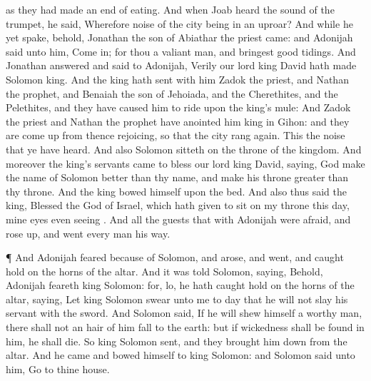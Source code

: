 {{} as they had made an
end of
eating. And when
Joab
heard the
sound of the
trumpet, he
said, Wherefore
{}
noise of the
city being in an
uproar?
And while he yet
spake, behold,
Jonathan the
son of
Abiathar the
priest
came: and
Adonijah
said unto him, Come
in; for thou
{} a
valiant
man, and
bringest
good
tidings.
And
Jonathan
answered and
said to
Adonijah,
Verily our
lord
king
David hath made
Solomon
king.
And the
king hath
sent with him
Zadok the
priest, and
Nathan the
prophet, and
Benaiah the
son of
Jehoiada, and the
Cherethites, and the
Pelethites, and they have caused him to
ride upon the
king’s
mule:
And
Zadok the
priest and
Nathan the
prophet have
anointed him
king in
Gihon: and they are come
up from thence
rejoicing, so that the
city rang
again. This
{} the
noise that ye have
heard.
And also
Solomon
sitteth on the
throne of the
kingdom.
And moreover the
king’s
servants
came to
bless our
lord
king
David,
saying,
God make the
name of
Solomon
better than thy
name, and
make his
throne
greater than thy
throne. And the
king
bowed himself upon the
bed.
And also thus
said the
king,
Blessed
{} the
{}
God of
Israel, which hath
given
{} to
sit on my
throne this
day, mine
eyes even
seeing
{}.
And all the
guests that
{} with
Adonijah were
afraid, and rose
up, and
went every
man his
way.
\par }{\PP {}¶ And
Adonijah
feared
because of
Solomon, and
arose, and
went, and caught
hold on the
horns of the
altar.
And it was
told
Solomon,
saying, Behold,
Adonijah
feareth
king
Solomon: for, lo, he hath caught
hold on the
horns of the
altar,
saying, Let
king
Solomon
swear unto me to
day that he will not
slay his
servant with the
sword.
And
Solomon
said, If he will shew himself a
worthy
man, there shall not an
hair of him
fall to the
earth: but if
wickedness shall be
found in him, he shall
die.
So
king
Solomon
sent, and they brought him
down from the
altar. And he
came and
bowed himself to
king
Solomon: and
Solomon
said unto him,
Go to thine
house.

}
